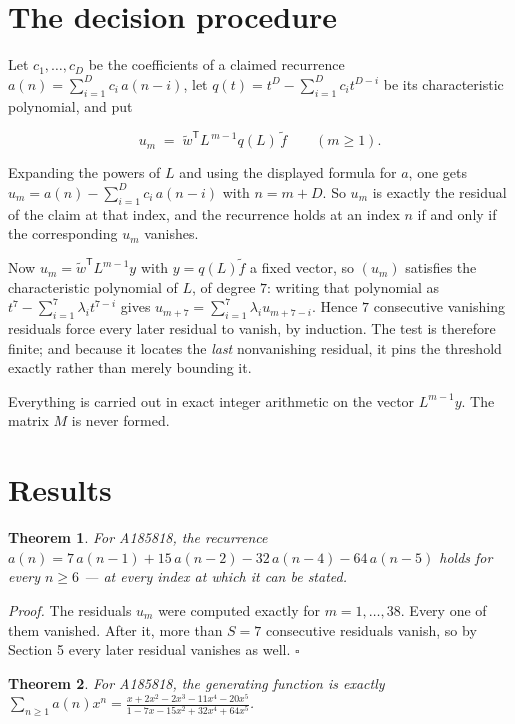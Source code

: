 \documentclass[11pt]{article}
\newtheorem{theorem}{Theorem}
\theoremstyle{definition}
\begin{document}
\section{The decision procedure}

Let $c_1,\dots,c_D$ be the coefficients of a claimed recurrence $a(n) = \sum_{i=1}^{D} c_i\,a(n-i)$, let $q(t) = t^{D} - \sum_{i=1}^{D} c_i t^{D-i}$ be its characteristic polynomial, and put

\[u_m \;=\; \tilde w^{\mathsf T} L^{\,m-1} q(L)\,\tilde f \qquad (m \ge 1).\]

Expanding the powers of $L$ and using the displayed formula for $a$, one gets $u_m = a(n) - \sum_{i=1}^{D} c_i\,a(n-i)$ with $n = m + D$. So $u_m$ is exactly the residual of the claim at that index, and the recurrence holds at an index $n$ if and only if the corresponding $u_m$ vanishes.

Now $u_m = \tilde w^{\mathsf T} L^{m-1} y$ with $y = q(L)\tilde f$ a fixed vector, so $(u_m)$ satisfies the characteristic polynomial of $L$, of degree $7$: writing that polynomial as $t^{7} - \sum_{i=1}^{7} \lambda_i t^{7-i}$ gives $u_{m+7} = \sum_{i=1}^{7} \lambda_i u_{m+7-i}$. Hence $7$ consecutive vanishing residuals force every later residual to vanish, by induction. The test is therefore finite; and because it locates the {\itshape last} nonvanishing residual, it pins the threshold exactly rather than merely bounding it.

Everything is carried out in exact integer arithmetic on the vector $L^{m-1}y$. The matrix $M$ is never formed.

\section{Results}

\begin{theorem} For A185818, the recurrence $a(n) = 7\,a(n-1) + 15\,a(n-2) - 32\,a(n-4) - 64\,a(n-5)$ holds for every $n \ge 6$ --- at every index at which it can be stated.\end{theorem}

{\itshape Proof.} The residuals $u_m$ were computed exactly for $m = 1,\dots,38$. Every one of them vanished. After it, more than $S = 7$ consecutive residuals vanish, so by Section 5 every later residual vanishes as well. $\square$

\begin{theorem} For A185818, the generating function is exactly $\sum_{n\ge 1} a(n)x^n = \frac{x + 2x^{2} - 2x^{3} - 11x^{4} - 20x^{5}}{1 - 7x - 15x^{2} + 32x^{4} + 64x^{5}}$.\end{theorem}
\end{document}
